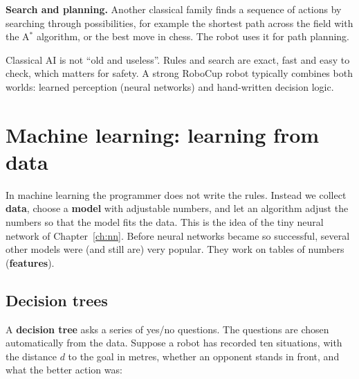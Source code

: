 \textbf{Search and planning.} Another classical family finds a sequence of actions by searching through possibilities, for example the shortest path across the field with the A$^*$ algorithm, or the best move in chess. The robot uses it for path planning.

\begin{aibox}
Classical AI is not ``old and useless''. Rules and search are exact, fast and easy to check, which matters for safety. A strong RoboCup robot typically combines both worlds: learned perception (neural networks) and hand-written decision logic.
\end{aibox}

\section*{Machine learning: learning from data}
In machine learning the programmer does not write the rules. Instead we collect \textbf{data}, choose a \textbf{model} with adjustable numbers, and let an algorithm adjust the numbers so that the model fits the data. This is the idea of the tiny neural network of Chapter~\ref{ch:nn}. Before neural networks became so successful, several other models were (and still are) very popular. They work on tables of numbers (\textbf{features}).

\subsection*{Decision trees}
A \textbf{decision tree} asks a series of yes/no questions. The questions are chosen automatically from the data. Suppose a robot has recorded ten situations, with the distance $d$ to the goal in metres, whether an opponent stands in front, and what the better action was:

